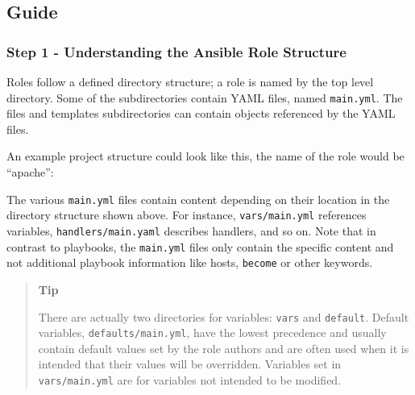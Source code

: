 \hypertarget{guide}{%
\subsection{Guide}\label{guide}}

\hypertarget{step-1---understanding-the-ansible-role-structure}{%
\subsubsection{Step 1 - Understanding the Ansible Role
Structure}\label{step-1---understanding-the-ansible-role-structure}}

Roles follow a defined directory structure; a role is named by the top
level directory. Some of the subdirectories contain YAML files, named
\texttt{main.yml}. The files and templates subdirectories can contain
objects referenced by the YAML files.

An example project structure could look like this, the name of the role
would be ``apache'':

\begin{Shaded}
\begin{Highlighting}[]
\end{Highlighting}
\end{Shaded}

The various \texttt{main.yml} files contain content depending on their
location in the directory structure shown above. For instance,
\texttt{vars/main.yml} references variables, \texttt{handlers/main.yaml}
describes handlers, and so on. Note that in contrast to playbooks, the
\texttt{main.yml} files only contain the specific content and not
additional playbook information like hosts, \texttt{become} or other
keywords.

\begin{quote}
\textbf{Tip}

There are actually two directories for variables: \texttt{vars} and
\texttt{default}. Default variables, \texttt{defaults/main.yml}, have
the lowest precedence and usually contain default values set by the role
authors and are often used when it is intended that their values will be
overridden. Variables set in \texttt{vars/main.yml} are for variables
not intended to be modified.
\end{quote}


